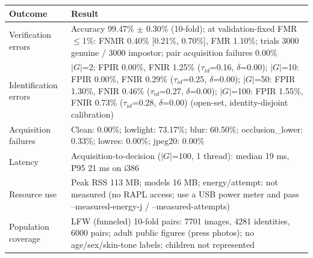 \begin{tabular}{p{2.6cm}p{5.4cm}}
\hline Outcome & Result \\\hline
Verification errors & Accuracy 99.47\% $\pm$ 0.30\% (10-fold); at validation-fixed FMR$\le$1\%: FNMR 0.40\% [0.21\%, 0.70\%], FMR 1.10\%; trials 3000 genuine / 3000 impostor; pair acquisition failures 0.00\% \\
Identification errors & $|G|$=2: FPIR 0.00\%, FNIR 1.25\% ($\tau_{id}$=0.16, $\delta$=0.00); $|G|$=10: FPIR 0.00\%, FNIR 0.29\% ($\tau_{id}$=0.25, $\delta$=0.00); $|G|$=50: FPIR 1.30\%, FNIR 0.46\% ($\tau_{id}$=0.27, $\delta$=0.00); $|G|$=100: FPIR 1.55\%, FNIR 0.73\% ($\tau_{id}$=0.28, $\delta$=0.00) (open-set, identity-disjoint calibration) \\
Acquisition failures & Clean: 0.00\%; lowlight: 73.17\%; blur: 60.50\%; occlusion\_lower: 0.33\%; lowres: 0.00\%; jpeg20: 0.00\% \\
Latency & Acquisition-to-decision ($|G|$=100, 1 thread): median 19 ms, P95 21 ms on i386 \\
Resource use & Peak RSS 113 MB; models 16 MB; energy/attempt: not measured (no RAPL access; use a USB power meter and pass --measured-energy-j / --measured-attempts) \\
Population coverage & LFW (funneled) 10-fold pairs: 7701 images, 4281 identities, 6000 pairs; adult public figures (press photos); no age/sex/skin-tone labels; children not represented \\
\hline\end{tabular}
